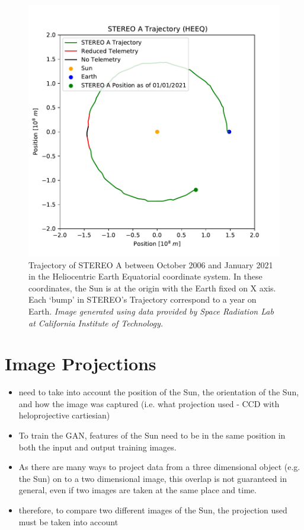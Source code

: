 \documentclass[11pt,a4paper,onecolumn]{report}
\begin{document}
\begin{figure}[ht]
  \centering
  \includegraphics[width = 0.7\linewidth]{STEREO_pos.pdf}
  \caption[STEREO A Trajectory]{Trajectory of STEREO A between October 2006 and January 2021 in the
  Heliocentric Earth Equatorial coordinate system. In these coordinates, the Sun
  is at the origin with the Earth fixed on X axis. Each `bump' in STEREO's
  Trajectory correspond to a year on Earth. \textit{Image generated using
  data provided by Space Radiation Lab at California Institute of Technology.}}
  \label{fig:stereo_pos}
\end{figure}


\section{Image Projections}

\begin{itemize}
  \item need to take into account the position of the Sun, the orientation of
  the Sun, and how the image was captured (i.e. what projection used - CCD with
  heloprojective cartiesian)
  \item To train the GAN, features of the Sun need to be in the same position in both
  the input and output training images.
  \item As there are many ways to project data from a three dimensional object
  (e.g. the Sun) on to a two dimensional image, this overlap is not guaranteed
  in general, even if two images are taken at the same place and time.
  \item therefore, to compare two different images of the Sun, the projection used
must be taken into account
\end{itemize}
\end{document}
